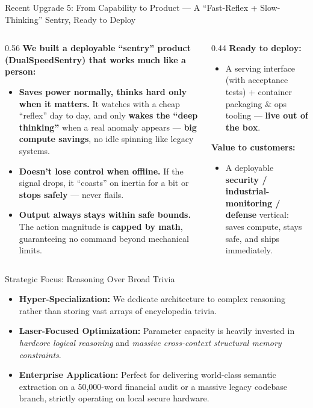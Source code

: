 ﻿\documentclass[aspectratio=169, 10pt]{beamer}
\begin{document}
\begin{frame}{Recent Upgrade 5: From Capability to Product --- A ``Fast-Reflex + Slow-Thinking'' Sentry, Ready to Deploy}
\small
\begin{columns}
\begin{column}{0.56\textwidth}
\textbf{We built a deployable ``sentry'' product (DualSpeedSentry) that works much like a person:}
\begin{itemize}\itemsep=0.35em
    \item \textbf{Saves power normally, thinks hard only when it matters.} It watches with a cheap ``reflex'' day to day, and only \textbf{wakes the ``deep thinking''} when a real anomaly appears --- \textbf{big compute savings}, no idle spinning like legacy systems.
    \item \textbf{Doesn't lose control when offline.} If the signal drops, it ``coasts'' on inertia for a bit or \textbf{stops safely} --- never flails.
    \item \textbf{Output always stays within safe bounds.} The action magnitude is \textbf{capped by math}, guaranteeing no command beyond mechanical limits.
\end{itemize}
\end{column}
\begin{column}{0.44\textwidth}
\textbf{Ready to deploy:}
\begin{itemize}\itemsep=0.3em
    \item A serving interface (with acceptance tests) + container packaging \& ops tooling --- \textbf{live out of the box}.
\end{itemize}
\vspace{0.4em}
\textbf{Value to customers:}
\begin{itemize}\itemsep=0.3em
    \item A deployable \textbf{security / industrial-monitoring / defense} vertical: saves compute, stays safe, and ships immediately.
\end{itemize}
\end{column}
\end{columns}
\end{frame}

\begin{frame}{Strategic Focus: Reasoning Over Broad Trivia}
\begin{itemize}
    \item \textbf{Hyper-Specialization:} We dedicate architecture to complex reasoning rather than storing vast arrays of encyclopedia trivia.
    \item \textbf{Laser-Focused Optimization:} Parameter capacity is heavily invested in \textit{hardcore logical reasoning} and \textit{massive cross-context structural memory constraints}.
    \item \textbf{Enterprise Application:} Perfect for delivering world-class semantic extraction on a 50,000-word financial audit or a massive legacy codebase branch, strictly operating on local secure hardware.
\end{itemize}
\end{frame}
\end{document}
